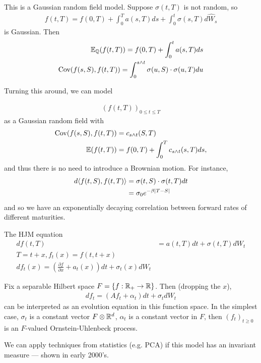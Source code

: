 \begin{exmp}
  \label{defn:bond_markets:10}
  This is a Gaussian random field model.  Suppose $\sigma(t, T)$ is
  not random, so
  \begin{align}
    \label{eq:163}
    f(t, T) = f(0, T) + \int_{0}^{T} a(s, T) ds + \int_{0}^{t}
    \sigma(s, T) d \hat W_{s}
  \end{align} is Gaussian.  Then
  \begin{align}
    \label{eq:164}
    \E{f(t, T)}{\Q} = f(0, T) + \int_{0}^{t} a(s, T) ds \\
    \Cov{f(s, S)}{f(t, T)} = \int_{0}^{s \wedge t} \sigma(u, S) \cdot
    \sigma(u, T) du
  \end{align}

  Turning this around, we can model 

  \begin{align}
    \label{eq:167}
    (f(t, T))_{0 \leq t \leq T}
  \end{align}
  as a Gaussian random field with
  \begin{align}
    \label{eq:165}
    \Cov{f(s, S)}{f(t, T)} &= c_{s \wedge t}(S, T) \\
    \E{f(t, T)} &= f(0, T) + \int_{0}^{T} c_{s \wedge t}(s, T) ds,
  \end{align} and thus there is no need to introduce a Brownian
  motion.  For instance,
  \begin{align}
    \label{eq:168}
    d \IP{f(t, S), f(t, T)} &= \sigma(t, S) \cdot \sigma(t, T) dt \\
    &= \sigma_{0} e^{-\beta|T - S|}
  \end{align} and so we have an exponentially decaying correlation
  between forward rates of different maturities.
\end{exmp}

\begin{exmp}
  \label{defn:bond_markets:11}
  The HJM equation
  \begin{align}
    \label{eq:169}
    df(t, T) &= a(t, T) dt + \sigma(t, T) d W_{t} \\
    T = t + x, f_{t}(x) = f(t, t + x) \\
    df_{t}(x) = (\frac{\partial f}{\partial x} + a_{t}(x)) dt +
    \sigma_{t}(x) dW_{t} 
  \end{align}

  Fix a separable Hilbert space $F = \{ f: \mathbb{R}_{+} \rightarrow
  \mathbb{R} \}$.  Then (dropping the $x$),
  \begin{align}
    \label{eq:170}
    df_{t} = \left(A f_{t} + \alpha_{t} \right) dt + \sigma_{t} dW_{t}
  \end{align}
  can be interpreted as an evolution equation in this function space.
  In the simplest case, $\sigma_{t}$ is a constant vector $F \otimes
  \mathbb{R}^{d}$, $\alpha_{t}$ is a constant vector in $F$, then $(f_{t})_{t
    \geq 0}$ is an $F$-valued Ornstein-Uhlenbeck process.

  We can apply techniques from statistics (e.g. PCA) if this model has
  an invariant measure --- shown in early 2000's.
\end{exmp}

